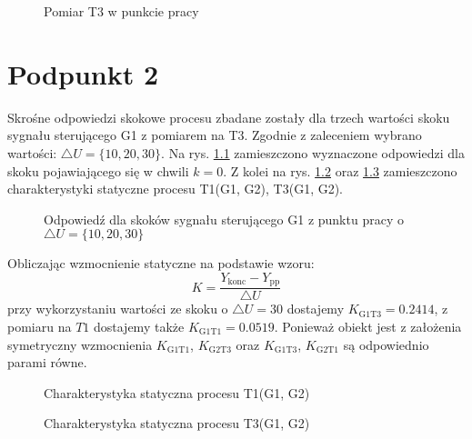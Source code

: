 \begin{figure}[ht]
\centering

\caption{Pomiar T3 w punkcie pracy}
\label{Z1T3}
\end{figure}

\chapter{Podpunkt 2}
Skrośne odpowiedzi skokowe procesu zbadane zostały dla trzech wartości skoku sygnału sterującego G1 z pomiarem na T3. Zgodnie z zaleceniem wybrano wartości: $\triangle U = \{10, 20, 30\}$. Na rys. \ref{Z2steps} zamieszczono wyznaczone odpowiedzi dla skoku pojawiającego się w chwili $k=\num{0}$. Z kolei na rys. \ref{Z2T1} oraz \ref{Z2T3} zamieszczono charakterystyki statyczne procesu T1(G1, G2), T3(G1, G2).

\begin{figure}[ht]
\centering

\caption{Odpowiedź dla skoków sygnału sterującego G1 z punktu pracy o $\triangle U = \{10, 20, 30\}$}
\label{Z2steps}
\end{figure}

Obliczając wzmocnienie statyczne na podstawie wzoru:
\begin{equation}
K=\frac{Y_{\mathrm{konc}}-Y_{\mathrm{pp}}}{\triangle U}
\end{equation}
przy wykorzystaniu wartości ze skoku o $ \triangle U = 30 $ dostajemy $K_{\mathrm{G1 T3}} = \num{0.2414}$, z pomiaru na $T1$ dostajemy także $K_{\mathrm{G1 T1}} = \num{0.0519}$. Ponieważ obiekt jest z założenia symetryczny wzmocnienia $K_{\mathrm{G1 T1}}$, $K_{\mathrm{G2 T3}}$ oraz $K_{\mathrm{G1 T3}}$, $K_{\mathrm{G2 T1}}$ są odpowiednio parami równe.

\begin{figure}[ht]
\centering

\caption{Charakterystyka statyczna procesu T1(G1, G2)}
\label{Z2T1}
\end{figure}

\begin{figure}[ht]
\centering

\caption{Charakterystyka statyczna procesu T3(G1, G2)}
\label{Z2T3}
\end{figure}


